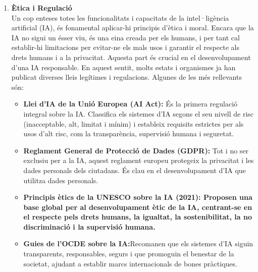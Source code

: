\begin{enumerate}

     \item \textbf{Ètica i Regulació}\\
      Un cop enteses totes les funcionalitats i capacitats de la intel·ligència artificial (IA), és fonamental aplicar-hi principis d’ètica i moral. Encara que la IA no sigui un ésser viu, és una eina creada per els  humans, i per tant cal establir-hi limitacions per evitar-ne els mals usos i garantir el respecte als drets humans i a la privacitat. Aquesta part és crucial en el desenvolupament d’una IA responsable. En aquest sentit, molts estats i organismes ja han publicat diverses lleis legítimes i regulacions. Algunes de les més rellevants són:
     \begin{itemize}
        \item \textbf{Llei d’IA de la Unió Europea (AI Act):} És la primera regulació integral sobre la IA. Classifica els sistemes d’IA segons el seu nivell de risc (inacceptable, alt, limitat i mínim) i estableix requisits estrictes per als usos d’alt risc, com la transparència, supervisió humana i seguretat.
           \item \textbf{Reglament General de Protecció de Dades (GDPR):} Tot i no ser exclusiu per a la IA, aquest reglament europeu protegeix la privacitat i les dades personals dels ciutadans. És clau en el desenvolupament d’IA que utilitza dades personals.
          \item \textbf{Principis ètics de la UNESCO sobre la IA (2021): Proposen una base global per al desenvolupament ètic de la IA, centrant-se en el respecte pels drets humans, la igualtat, la sostenibilitat, la no discriminació i la supervisió humana.}
          \item \textbf{Guies de l’OCDE sobre la IA:}Recomanen que els sistemes d’IA siguin transparents, responsables, segurs i que promoguin el benestar de la societat, ajudant a establir marcs internacionals de bones pràctiques.
     \end{itemize}


 \end{enumerate}





